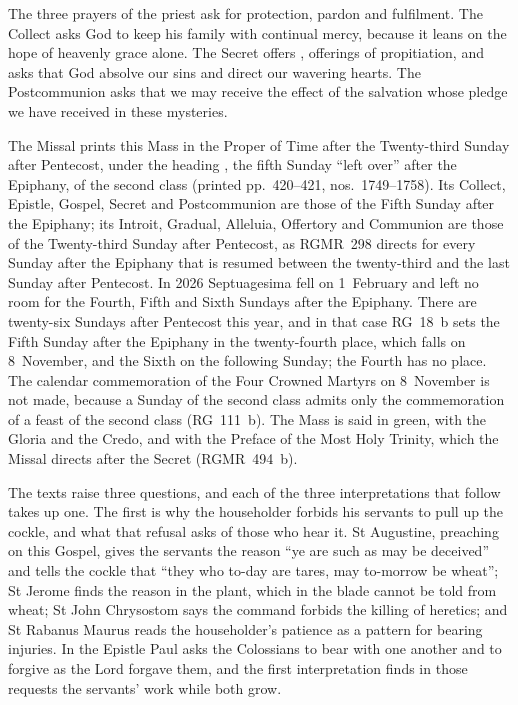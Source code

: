 The three prayers of the priest ask for protection, pardon and fulfilment. The
Collect asks God to keep his family with continual mercy, because it leans on
the hope of heavenly grace alone. The Secret offers , offerings of propitiation, and asks that God absolve our sins
and direct our wavering hearts. The Postcommunion asks that we may receive
the effect of the salvation whose pledge we have received in these mysteries.

The Missal prints this Mass in the Proper of Time after the Twenty-third
Sunday after Pentecost, under the heading , the fifth Sunday ``left over'' after the Epiphany,
of the second class (printed pp.~420--421, nos.~1749--1758). Its Collect,
Epistle, Gospel, Secret and Postcommunion are those of the Fifth Sunday after
the Epiphany; its Introit, Gradual, Alleluia, Offertory and Communion are those
of the Twenty-third Sunday after Pentecost, as RGMR~298 directs for every
Sunday after the Epiphany that is resumed between the twenty-third and the
last Sunday after Pentecost. In 2026 Septuagesima fell on 1~February and left
no room for the Fourth, Fifth and Sixth Sundays after the Epiphany. There are
twenty-six Sundays after Pentecost this year, and in that case RG~18~b sets
the Fifth Sunday after the Epiphany in the twenty-fourth place, which falls on
8~November, and the Sixth on the following Sunday; the Fourth has no place.
The calendar commemoration of the Four Crowned Martyrs on 8~November is not
made, because a Sunday of the second class admits only the commemoration of a
feast of the second class (RG~111~b). The Mass is said in green, with the
Gloria and the Credo, and with the Preface of the Most Holy Trinity, which the
Missal directs after the Secret (RGMR~494~b).

The texts raise three questions, and each of the three interpretations that
follow takes up one. The first is why the householder forbids his servants to
pull up the cockle, and what that refusal asks of those who hear it. St
Augustine, preaching on this Gospel, gives the servants the reason ``ye are
such as may be deceived'' and tells the cockle that ``they who to-day are tares,
may to-morrow be wheat''; St Jerome finds the reason in the plant, which in the
blade cannot be told from wheat; St John Chrysostom says the command forbids
the killing of heretics; and St Rabanus Maurus reads the householder's
patience as a pattern for bearing injuries. In the Epistle Paul asks the
Colossians to bear with one another and to forgive as the Lord forgave them,
and the first interpretation finds in those requests the servants' work while
both grow.

